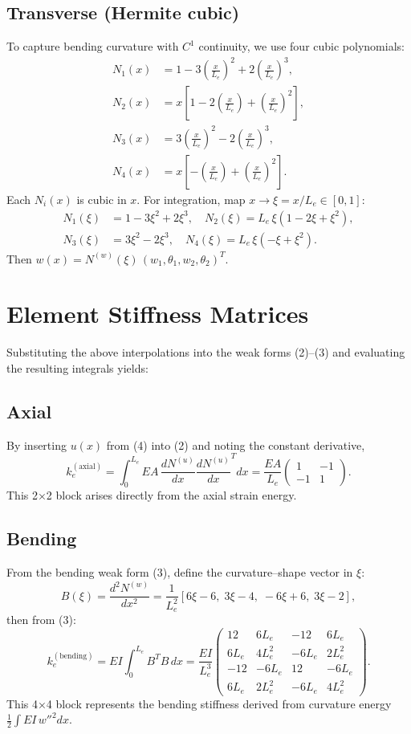 \documentclass[preprint,12pt]{elsarticle}
\begin{document}
	\subsection{Transverse (Hermite cubic)}
	To capture bending curvature with \(C^1\) continuity, we use four cubic polynomials:
	\[
	\begin{aligned}
		N_1(x)&=1-3(\tfrac{x}{L_e})^2+2(\tfrac{x}{L_e})^3,\\
		N_2(x)&=x[1-2(\tfrac{x}{L_e})+(\tfrac{x}{L_e})^2],\\
		N_3(x)&=3(\tfrac{x}{L_e})^2-2(\tfrac{x}{L_e})^3,\\
		N_4(x)&=x[-(\tfrac{x}{L_e})+(\tfrac{x}{L_e})^2].
	\end{aligned}
	\]
	Each \(N_i(x)\) is cubic in \(x\).  For integration, map \(x\to\xi=x/L_e\in[0,1]\):
	\[
	\begin{aligned}
		N_1(\xi)&=1-3\xi^2+2\xi^3,\quad
		N_2(\xi)=L_e\,\xi(1-2\xi+\xi^2),\\
		N_3(\xi)&=3\xi^2-2\xi^3,\quad
		N_4(\xi)=L_e\,\xi(-\xi+\xi^2).
	\end{aligned}
	\tag{5}
	\]
	Then \(w(x)=N^{(w)}(\xi)\,(w_1,\theta_1,w_2,\theta_2)^T\).
	
	\section{Element Stiffness Matrices}
	Substituting the above interpolations into the weak forms (2)–(3) and evaluating the resulting integrals yields:
	
	\subsection{Axial}
	By inserting \(u(x)\) from (4) into (2) and noting the constant derivative,
	\[
	k_e^{(\mathrm{axial})}
	= \int_0^{L_e}EA\,\frac{dN^{(u)}}{dx}\frac{dN^{(u)}}{dx}^Tdx
	= \frac{EA}{L_e}
	\begin{pmatrix}1 & -1\\ -1 & 1\end{pmatrix}.
	\tag{6}
	\]
	This 2×2 block arises directly from the axial strain energy.
	
	\subsection{Bending}
	From the bending weak form (3), define the curvature–shape vector in $\xi$:
	\[
	B(\xi)
	= \frac{d^2N^{(w)}}{dx^2}
	= \frac{1}{L_e^2}[6\xi-6,\;3\xi-4,\;-6\xi+6,\;3\xi-2],
	\tag{7a}
	\]
	then from (3):
	\[
	k_e^{(\mathrm{bending})}
	= EI\int_0^{L_e}B^T B\,dx
	= \frac{EI}{L_e^3}
	\begin{pmatrix}
		12 & 6L_e & -12 & 6L_e\\
		6L_e & 4L_e^2 & -6L_e & 2L_e^2\\
		-12 & -6L_e & 12 & -6L_e\\
		6L_e & 2L_e^2 & -6L_e & 4L_e^2
	\end{pmatrix}.
	\tag{7b}
	\]
	This 4×4 block represents the bending stiffness derived from curvature energy \(\tfrac12\int EI\,w''^2dx\).
	
\end{document}
